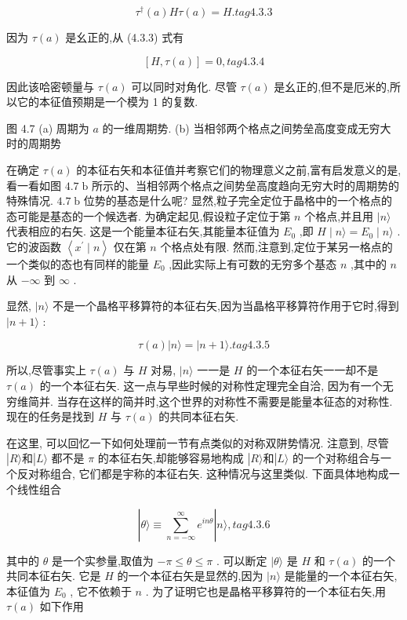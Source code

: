 $$
{\tau }^{ \dagger }\left( a\right) {H\tau }\left( a\right) = H. tag{4.3.3}
$$

因为 $\tau \left( a\right)$ 是幺正的,从 (4.3.3) 式有

$$
\left\lbrack {H,\tau \left( a\right) }\right\rbrack = 0, tag{4.3.4}
$$

因此该哈密顿量与 $\tau \left( a\right)$ 可以同时对角化. 尽管 $\tau \left( a\right)$ 是幺正的,但不是厄米的,所以它的本征值预期是一个模为 1 的复数.


图 4.7 (a) 周期为 $a$ 的一维周期势. (b) 当相邻两个格点之间势垒高度变成无穷大时的周期势

在确定 $\tau \left( a\right)$ 的本征右矢和本征值并考察它们的物理意义之前,富有启发意义的是, 看一看如图 ${4.7}\mathrm{\;b}$ 所示的、当相邻两个格点之间势垒高度趋向无穷大时的周期势的特殊情况. ${4.7}\mathrm{\;b}$ 位势的基态是什么呢? 显然,粒子完全定位于晶格中的一个格点的态可能是基态的一个候选者. 为确定起见,假设粒子定位于第 $n$ 个格点,并且用 $|n\rangle$ 代表相应的右矢. 这是一个能量本征右矢,其能量本征值为 ${E}_{0}$ ,即 $H \mid n\rangle = {E}_{0} \mid n\rangle$ . 它的波函数 $\left\langle {{x}^{\prime } \mid n}\right\rangle$ 仅在第 $n$ 个格点处有限. 然而,注意到,定位于某另一格点的一个类似的态也有同样的能量 ${E}_{0}$ ,因此实际上有可数的无穷多个基态 $n$ ,其中的 $n$ 从 $- \infty$ 到 $\infty$ .

显然, $|n\rangle$ 不是一个晶格平移算符的本征右矢,因为当晶格平移算符作用于它时,得到 $|n + 1\rangle$ :

$$
\tau \left( a\right) \left| {n\rangle = }\right| n + 1\rangle . tag{4.3.5}
$$

所以,尽管事实上 $\tau \left( a\right)$ 与 $H$ 对易, $|n\rangle$ 一一是 $H$ 的一个本征右矢一一却不是 $\tau \left( a\right)$ 的一个本征右矢. 这一点与早些时候的对称性定理完全自洽, 因为有一个无穷维简并. 当存在这样的简并时,这个世界的对称性不需要是能量本征态的对称性. 现在的任务是找到 $H$ 与 $\tau \left( a\right)$ 的共同本征右矢.

在这里, 可以回忆一下如何处理前一节有点类似的对称双阱势情况. 注意到, 尽管 $\left| {R\rangle \text{和}}\right| L\rangle$ 都不是 $\pi$ 的本征右矢,却能够容易地构成 $\left| {R\rangle \text{和}}\right| L\rangle$ 的一个对称组合与一个反对称组合, 它们都是宇称的本征右矢. 这种情况与这里类似. 下面具体地构成一个线性组合

$$
|\theta \rangle \equiv \mathop{\sum }\limits_{{n = - \infty }}^{\infty }{e}^{in\theta }|n\rangle , tag{4.3.6}
$$

其中的 $\theta$ 是一个实参量,取值为 $- \pi \leq \theta \leq \pi$ . 可以断定 $|\theta \rangle$ 是 $H$ 和 $\tau \left( a\right)$ 的一个共同本征右矢. 它是 $H$ 的一个本征右矢是显然的,因为 $|n\rangle$ 是能量的一个本征右矢,本征值为 ${E}_{0}$ , 它不依赖于 $n$ . 为了证明它也是晶格平移算符的一个本征右矢,用 $\tau \left( a\right)$ 如下作用

